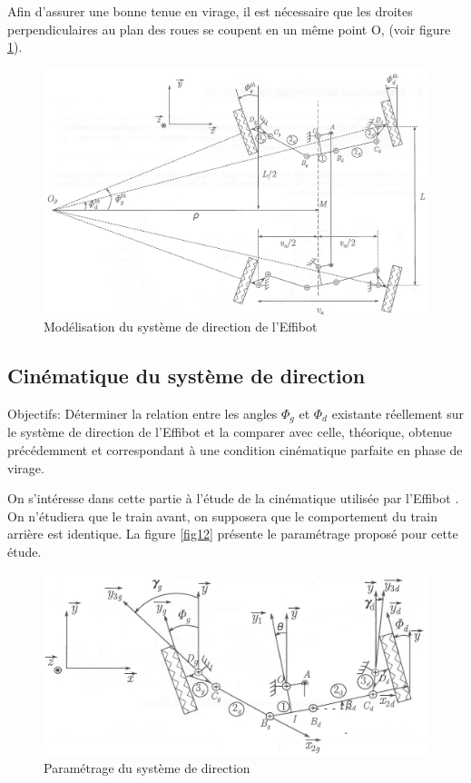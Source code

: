 Afin d'assurer une bonne tenue en virage, il est nécessaire que les droites perpendiculaires au plan des roues se coupent en un même point O, (voir figure \ref{fig10}).

\begin{figure}[ht!]
\begin{center}
 \includegraphics[width=0.8\linewidth]{img/fig11}
\end{center}
\caption{Modélisation du système de direction de l'Effibot}
\label{fig10}
\end{figure}

\newpage


\subsection{Cinématique du système de direction}

Objectifs: Déterminer la relation entre les angles $\Phi_g$ et $\Phi_d$ existante réellement sur le système de direction de l'Effibot et la comparer avec celle, théorique, obtenue précédemment et correspondant à une condition cinématique parfaite en phase de virage.

On s'intéresse dans cette partie à l'étude de la cinématique utilisée par \og l'Effibot \fg. On n'étudiera que le train avant, on supposera que le comportement du train arrière est identique. La figure \ref{fig12} présente le paramétrage proposé pour cette étude.

\begin{figure}[ht!]
\begin{center}
 \includegraphics[width=0.6\linewidth]{img/fig12}
\end{center}
\caption{Paramétrage du système de direction}
\label{fig11}
\end{figure}

